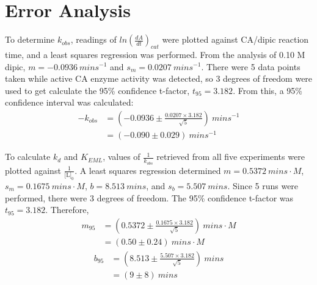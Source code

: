 \section{Error Analysis}
To determine $k_{obs}$, readings of $ln \left(\frac{dA}{dt}\right)_{cat}$ were plotted against CA/dipic reaction time, and a least squares regression was performed. From the analysis of 0.10 M dipic, $m=-0.0936{\ }{mins}^{-1}$ and $s_m=0.0207{\ }{mins}^{-1}$. There were 5 data points taken while active CA enzyme activity was detected, so 3 degrees of freedom were used to get calculate the 95\% confidence t-factor, $t_{95}=3.182$. From this, a 95\% confidence interval was calculated:
\begin{equation*}
\begin{split}
-k_{obs}&=\left (-0.0936\pm\frac{0.0207\times{3.182}}{\sqrt{5}}\right ){\ }{mins}^{-1}\\
&=\left (-0.090\pm0.029\right ){\ }{mins}^{-1}
\end{split}
\end{equation*}

To calculate $k_{d}$ and $K_{EML}$, values of $\frac{1}{k_{obs}}$ retrieved from all five experiments were plotted against $\frac{1}{\text{[L]}_0}$. A least squares regression determined $m=0.5372{\ }mins\cdot{M}$, $s_m=0.1675{\ }mins\cdot{M}$, $b=8.513{\ }{mins}$, and $s_b=5.507{\ }{mins}$. Since 5 runs were performed, there were 3 degrees of freedom. The 95\% confidence t-factor was $t_{95}=3.182$. Therefore,
\begin{equation}\label{eqn:err_analysis_m}
\begin{split}
m_{95}&=\left (0.5372\pm\frac{0.1675\times{3.182}}{\sqrt{5}}\right ){\ }mins\cdot{M}\\
&=\left (0.50\pm0.24\right ){\ }mins\cdot{M}
\end{split}
\end{equation}
\begin{equation}\label{eqn:err_analysis_b}
\begin{split}
b_{95}&=\left (8.513\pm\frac{5.507\times{3.182}}{\sqrt{5}}\right ){\ }{mins}\\
&=\left (9\pm8\right ){\ }{mins}
 \end{split}
\end{equation}

